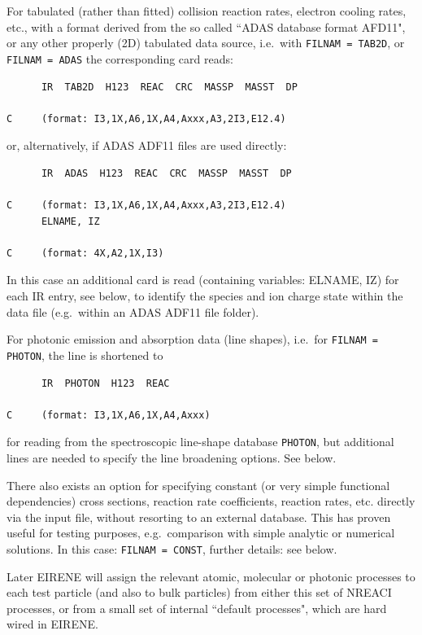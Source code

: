 For tabulated (rather than fitted) collision reaction rates, electron cooling
rates, etc., with a format derived from the so called ``\ac{ADAS} database
format AFD11", or any other properly (2D) tabulated data source, i.e.\ with
\lstinline|FILNAM = TAB2D|, or \lstinline|FILNAM = ADAS| the corresponding card reads:

\begin{lstlisting}
      IR  TAB2D  H123  REAC  CRC  MASSP  MASST  DP

C     (format: I3,1X,A6,1X,A4,Axxx,A3,2I3,E12.4)
\end{lstlisting}

or, alternatively, if \ac{ADAS}
ADF11 files are used directly:

\begin{lstlisting}
      IR  ADAS  H123  REAC  CRC  MASSP  MASST  DP

C     (format: I3,1X,A6,1X,A4,Axxx,A3,2I3,E12.4)
      ELNAME, IZ

C     (format: 4X,A2,1X,I3)
\end{lstlisting}

In this case an additional card is read (containing variables: ELNAME, IZ) for
each IR entry, see below, to identify the species and ion charge state within
the data file (e.g.\ within an \ac{ADAS} ADF11 file folder).

For photonic emission and absorption data (line shapes), i.e.\ for
\lstinline|FILNAM = PHOTON|, the line is shortened to

\begin{lstlisting}
      IR  PHOTON  H123  REAC

C     (format: I3,1X,A6,1X,A4,Axxx)
\end{lstlisting}

for reading from the spectroscopic line-shape database \lstinline|PHOTON|,
but additional lines are needed to specify the line broadening options.
See below.

There also exists an option for specifying constant (or very simple functional
dependencies) cross sections, reaction rate coefficients, reaction rates, etc.
directly via the input file, without resorting to an external database.
This has proven useful for testing purposes, e.g.\ comparison with simple
analytic or numerical solutions.
In this case: \lstinline|FILNAM = CONST|, further details: see below.

Later EIRENE will assign the relevant atomic, molecular or photonic processes
to each test particle (and also to bulk particles) from either this set of
NREACI processes, or from a small set of internal ``default processes", which
are hard wired in EIRENE.

